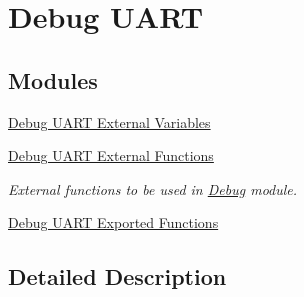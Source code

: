 \hypertarget{group___debug___uart}{}\section{Debug U\+A\+RT}
\label{group___debug___uart}
\subsection*{Modules}
\begin{DoxyCompactItemize}
\item 
\hyperlink{group___debug___u_a_r_t___external___variables}{Debug U\+A\+R\+T External Variables}
\item 
\hyperlink{group___debug___u_a_r_t___external___functions}{Debug U\+A\+R\+T External Functions}
\begin{DoxyCompactList}\small\item\em External functions to be used in \hyperlink{group___debug}{Debug} module. \end{DoxyCompactList}\item 
\hyperlink{group___debug___uart___exported___functions}{Debug U\+A\+R\+T Exported Functions}
\end{DoxyCompactItemize}


\subsection{Detailed Description}

